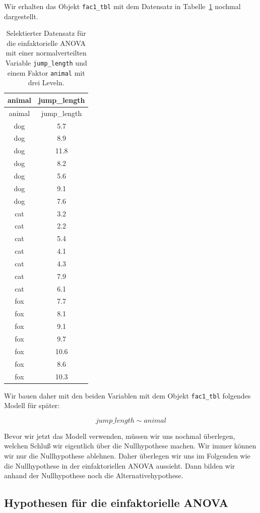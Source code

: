 \documentclass[
  letterpaper,
]{scrbook}
\begin{document}
Wir erhalten das Objekt \texttt{fac1\_tbl} mit dem Datensatz in
Tabelle~\ref{tbl-data-anova-1} nochmal dargestellt.

\hypertarget{tbl-data-anova-1}{}
\begin{longtable}[]{@{}cc@{}}
\caption{\label{tbl-data-anova-1}Selektierter Datensatz für die
einfaktorielle ANOVA mit einer normalverteilten Variable
\texttt{jump\_length} und einem Faktor \texttt{animal} mit drei
Leveln.}\tabularnewline
\toprule()
animal & jump\_length \\
\midrule()
\endfirsthead
\toprule()
animal & jump\_length \\
\midrule()
\endhead
dog & 5.7 \\
dog & 8.9 \\
dog & 11.8 \\
dog & 8.2 \\
dog & 5.6 \\
dog & 9.1 \\
dog & 7.6 \\
cat & 3.2 \\
cat & 2.2 \\
cat & 5.4 \\
cat & 4.1 \\
cat & 4.3 \\
cat & 7.9 \\
cat & 6.1 \\
fox & 7.7 \\
fox & 8.1 \\
fox & 9.1 \\
fox & 9.7 \\
fox & 10.6 \\
fox & 8.6 \\
fox & 10.3 \\
\bottomrule()
\end{longtable}

Wir bauen daher mit den beiden Variablen mit dem Objekt
\texttt{fac1\_tbl} folgendes Modell für später:

\[
jump\_length \sim animal
\]

Bevor wir jetzt das Modell verwenden, müssen wir uns nochmal überlegen,
welchen Schluß wir eigentlich über die Nullhypothese machen. Wir immer
können wir nur die Nullhypothese ablehnen. Daher überlegen wir uns im
Folgenden wie die Nullhypothese in der einfaktoriellen ANOVA aussieht.
Dann bilden wir anhand der Nullhypothese noch die Alternativehypothese.

\hypertarget{hypothesen-fuxfcr-die-einfaktorielle-anova}{%
\subsection{Hypothesen für die einfaktorielle
ANOVA}\label{hypothesen-fuxfcr-die-einfaktorielle-anova}}
\end{document}
